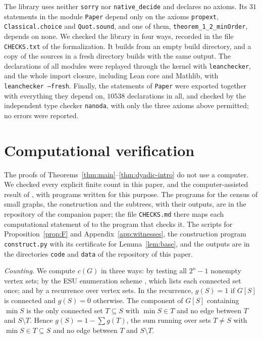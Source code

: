 \documentclass[11pt]{amsart}
\theoremstyle{definition}
\theoremstyle{remark}
\begin{document}
The library uses neither \texttt{sorry} nor \texttt{native\_decide} and declares no axioms. Its $31$ statements in the module \texttt{Paper} depend only on the axioms \texttt{propext}, \texttt{Classical.choice} and \texttt{Quot.sound}, and one of them, \texttt{theorem\_1\_2\_minOrder}, depends on none. We checked the library in four ways, recorded in the file \texttt{CHECKS.txt} of the formalization. It builds from an empty build directory, and a copy of the sources in a fresh directory builds with the same output. The declarations of all modules were replayed through the kernel with \texttt{leanchecker}, and the whole import closure, including Lean core and Mathlib, with \texttt{leanchecker --fresh}. Finally, the statements of \texttt{Paper} were exported together with everything they depend on, $10538$ declarations in all, and checked by the independent type checker \texttt{nanoda}, with only the three axioms above permitted; no errors were reported.

\section{Computational verification}\label{sec:computation}

The proofs of Theorems~\ref{thm:main}--\ref{thm:dyadic-intro} do not use a computer. We checked every explicit finite count in this paper, and the computer-assisted result of \cite{CORa}, with programs written for this purpose. The programs for the census of small graphs, the construction and the subtrees, with their outputs, are in the repository \cite{Rep} of the companion paper; the file \texttt{CHECKS.md} there maps each computational statement of \cite{AA2} to the program that checks it. The scripts for Proposition~\ref{prop:F} and Appendix~\ref{app:witnesses}, the construction program \texttt{construct.py} with its certificate for Lemma~\ref{lem:base}, and the outputs are in the directories \texttt{code} and \texttt{data} of the repository \cite{GRep} of this paper.

\emph{Counting.} We compute $c(G)$ in three ways: by testing all $2^n-1$ nonempty vertex sets; by the ESU enumeration scheme \cite{We}, which lists each connected set once; and by a recurrence over vertex sets. In the recurrence, $g(S)=1$ if $G[S]$ is connected and $g(S)=0$ otherwise. The component of $G[S]$ containing $\min S$ is the only connected set $T\subseteq S$ with $\min S\in T$ and no edge between $T$ and $S\setminus T$. Hence $g(S)=1-\sum g(T)$, the sum running over sets $T\ne S$ with $\min S\in T\subseteq S$ and no edge between $T$ and $S\setminus T$.
\end{document}
